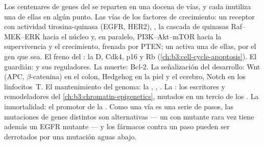 \begin{proposition}\label{prop:b3:cancer-biology:pathways}
Los centenares de genes del  se reparten en una docena de vías, y
cada  inutiliza una de ellas en algún punto. Las vías de los
factores de crecimiento: un receptor con actividad tirosina-quinasa
(EGFR, HER2), , la cascada de quinasas Raf--MEK--ERK hacia el núcleo
y, en paralelo, PI3K--Akt--mTOR hacia la supervivencia y el crecimiento,
frenada por PTEN; un  activa una de ellas, por el gen que sea. El
freno del : la  D, Cdk4, p16 y Rb
(\cref{ch:b3:cell-cycle-apoptosis}). El guardián:  y sus reguladores.
La muerte: Bcl-2. La señalización del desarrollo: Wnt (APC,
$\beta$-catenina) en el colon, Hedgehog en la piel y el cerebro, Notch en
los linfocitos~T. El mantenimiento del genoma: la , , . La : los escritores y
remodeladores del \cref{ch:b3:chromatin-epigenetics}, mutados en un
tercio de los . La inmortalidad: el promotor de la .
Como una vía es una serie de pasos, las mutaciones de genes distintos son
alternativas --- un  con  mutante rara vez tiene además un EGFR
mutante --- y los fármacos contra un paso pueden ser derrotados por una
mutación aguas abajo.
\end{proposition}

